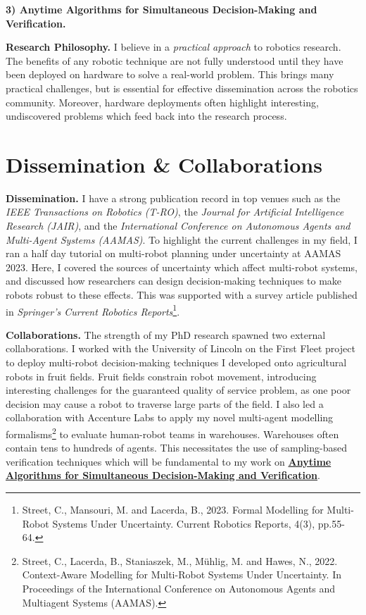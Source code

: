 \documentclass[12pt]{article}
\newcommand{\anytime}{\hyperlink{topicthree}{\textbf{Anytime Algorithms for Simultaneous Decision-Making and Verification}}}
\begin{document}
\vspace*{1ex}\noindent\hypertarget{topicthree}{\textbf{3) Anytime Algorithms for Simultaneous Decision-Making and Verification.}}

\vspace*{1ex}\noindent\textbf{Research Philosophy.} I believe in a \emph{practical approach} to robotics research.
%
The benefits of any robotic technique are not fully understood until they have been deployed on hardware to solve a real-world problem.
%
This brings many practical challenges, but is essential for effective dissemination across the robotics community.
%
Moreover, hardware deployments often highlight interesting, undiscovered problems which feed back into the research process.

\section*{Dissemination \& Collaborations}

\vspace*{1ex}\noindent\textbf{Dissemination.} I have a strong publication record in top venues such as the \emph{IEEE Transactions on Robotics (T-RO)}, the \emph{Journal for Artificial Intelligence Research (JAIR)}, and the \emph{International Conference on Autonomous Agents and Multi-Agent Systems (AAMAS)}.
%
To highlight the current challenges in my field, I ran a half day tutorial on multi-robot planning under uncertainty at AAMAS 2023.
%
Here, I covered the sources of uncertainty which affect multi-robot systems, and discussed how researchers can design decision-making techniques to make robots robust to these effects.
%
This was supported with a survey article published in \emph{Springer's Current Robotics Reports}\footnote{Street, C., Mansouri, M. and Lacerda, B., 2023. Formal Modelling for Multi-Robot Systems Under Uncertainty. Current Robotics Reports, 4(3), pp.55-64.}.

\vspace*{1ex}\noindent\textbf{Collaborations.} The strength of my PhD research spawned two external collaborations.
%
I worked with the University of Lincoln on the First Fleet project to deploy multi-robot decision-making techniques I developed onto agricultural robots in fruit fields.
%
Fruit fields constrain robot movement, introducing interesting challenges for the guaranteed quality of service problem, as one poor decision may cause a robot to traverse large parts of the field.
%
I also led a collaboration with Accenture Labs to apply my novel multi-agent modelling formalisms\footnote{Street, C., Lacerda, B., Staniaszek, M., Mühlig, M. and Hawes, N., 2022. Context-Aware Modelling for Multi-Robot Systems Under Uncertainty. In Proceedings of the International Conference on Autonomous Agents
and Multiagent Systems (AAMAS).} to evaluate human-robot teams in warehouses.
%
Warehouses often contain tens to hundreds of agents.
%
This necessitates the use of sampling-based verification techniques which will be fundamental to my work on \anytime. 
\end{document}
